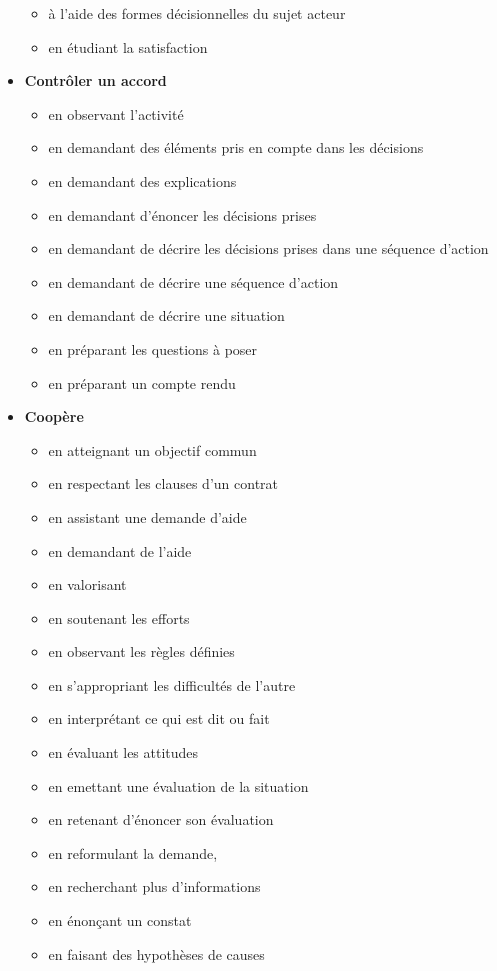 \documentclass[8pt,a4paper]{article}
\begin{document}
\begin{itemize}
\begin{itemize}
\item à l'aide des formes décisionnelles du sujet acteur
\item en étudiant la satisfaction
\\ 
 \end{itemize}
\item \textbf{Contrôler un accord}
\begin{itemize}
\item en observant l'activité
\item en demandant des éléments pris en compte dans les décisions
\item en demandant des explications
\item en demandant d'énoncer les décisions prises  
\item en demandant de décrire les décisions prises dans une séquence d'action
\item en demandant de décrire une séquence d'action
\item en demandant de décrire une situation  
\item en préparant les questions à poser
\item en préparant un compte rendu
\\ 
 \end{itemize}
\item \textbf{Coopère}
\begin{itemize}
\item en atteignant un objectif commun
\item en respectant les clauses d'un contrat
\item en assistant une demande d'aide
\item en demandant de l'aide
\item en valorisant
\item en soutenant les efforts
\item en observant les règles définies
\item en s'appropriant les difficultés de l'autre  
\item en interprétant ce qui est dit ou fait
\item en évaluant les attitudes  
\item en emettant une évaluation de la situation  
\item en retenant d'énoncer son évaluation  
\item en reformulant la demande,  
\item en recherchant plus d'informations  
\item en énonçant un constat
\item en faisant des hypothèses de causes

\end{itemize}
\end{itemize}
\end{document}
